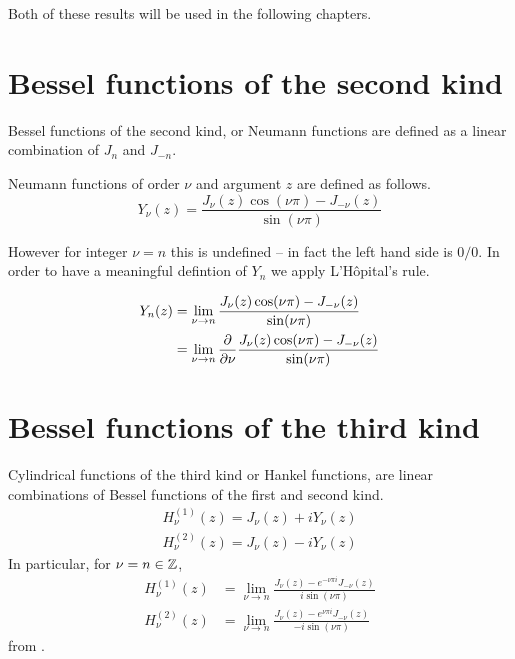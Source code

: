Both of these results will be used in the following chapters.

\section{Bessel functions of the second kind}

Bessel functions of the second kind, or Neumann functions are defined as a linear combination of $J_n$ and $J_{-n}$.

\begin{defn} \label{defn:neumann_function} Neumann functions of order $\nu$ and argument $z$ are defined as follows.
  \[Y_\nu(z) = \frac{J_\nu(z) \cos (\nu \pi)- J_{-\nu}(z)}{\sin (\nu \pi)}\]
\end{defn}

However for integer $\nu=n$ this is undefined -- in fact the left hand side is $0/0$. In order to have a meaningful defintion of $Y_n$ we apply L'Hôpital's rule.

\begin{align*}
  Y_n(z) &= \lim_ {\nu \rightarrow n}\frac{J_\nu(z) \cos (\nu \pi)- J_{-\nu}(z)}{\sin (\nu \pi)} \\
      &= \lim_ {\nu \rightarrow n} \frac{\partial }{\partial \nu} \frac{J_\nu(z) \cos (\nu \pi)- J_{-\nu}(z)}{\sin (\nu \pi)}
\end{align*}


\section{Bessel functions of the third kind}

\begin{defn}\label{defn:hankel_func}
  Cylindrical functions of the third kind or Hankel functions, are linear combinations of Bessel functions of the first and second kind.
    \begin{align*}
        H^{(1)}_\nu(z) = J_\nu(z) + i Y_\nu(z)\\
        H^{(2)}_\nu(z) = J_\nu(z) - i Y_\nu(z)
    \end{align*}
  In particular, for $\nu = n \in \mathbb{Z}$,
    \begin{align*}
      H^{(1)}_\nu(z)
        &= \lim_{\nu \rightarrow n} \frac{J_{\nu}(z) - e^{-\nu\pi i} J_{-\nu}(z)}{i \sin(\nu \pi)} \\
      H^{(2)}_\nu(z)
        &= \lim_{\nu \rightarrow n} \frac{J_{\nu}(z) - e^{\nu\pi i} J_{-\nu}(z)}{- i \sin(\nu \pi)}
    \end{align*}
  from \cite{karmazina19cylinderfunc}.
\end{defn}

